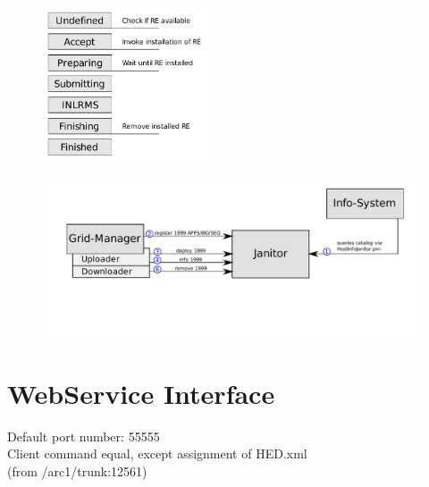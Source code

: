 \newenvironment{note}
{\rule{1ex}{1ex}\hspace{\stretch{1}}}
{\hspace{\stretch{1}}\rule{1ex}{1ex}\\}

\begin{figure}[!h]
  \begin{center}
    \includegraphics[width=5cm]{images/arex-stages.pdf}
    \mycaption{}{}
    \label{fig:arex_states}
  \end{center}
\end{figure}

\begin{figure}[!h]
  \begin{center}
    \includegraphics[width=12cm]{images/janitor_integration_2nd_edition.pdf}
    \mycaption{}{}
    \label{fig:janitor_integration_2}
  \end{center}
\end{figure}

\section{WebService Interface}

Default port number: 55555\\
Client command equal, except assignment of HED.xml\\
 (from /arc1/trunk:12561)

